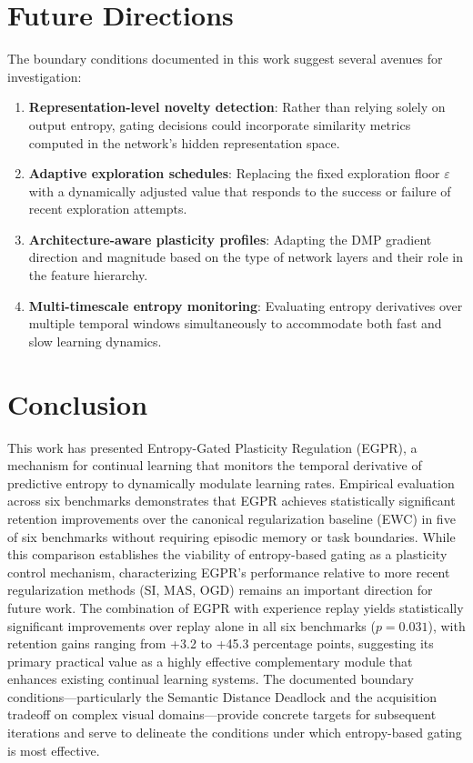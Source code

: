 \documentclass[11pt,a4paper]{article}
\begin{document}
\section{Future Directions}

The boundary conditions documented in this work suggest several avenues for investigation:

\begin{enumerate}
    \item \textbf{Representation-level novelty detection}: Rather than relying solely on output entropy, gating decisions could incorporate similarity metrics computed in the network's hidden representation space.
    \item \textbf{Adaptive exploration schedules}: Replacing the fixed exploration floor $\varepsilon$ with a dynamically adjusted value that responds to the success or failure of recent exploration attempts.
    \item \textbf{Architecture-aware plasticity profiles}: Adapting the DMP gradient direction and magnitude based on the type of network layers and their role in the feature hierarchy.
    \item \textbf{Multi-timescale entropy monitoring}: Evaluating entropy derivatives over multiple temporal windows simultaneously to accommodate both fast and slow learning dynamics.
\end{enumerate}

\section{Conclusion}

This work has presented Entropy-Gated Plasticity Regulation (EGPR), a mechanism for continual learning that monitors the temporal derivative of predictive entropy to dynamically modulate learning rates. Empirical evaluation across six benchmarks demonstrates that EGPR achieves statistically significant retention improvements over the canonical regularization baseline (EWC) in five of six benchmarks without requiring episodic memory or task boundaries. While this comparison establishes the viability of entropy-based gating as a plasticity control mechanism, characterizing EGPR's performance relative to more recent regularization methods (SI, MAS, OGD) remains an important direction for future work. The combination of EGPR with experience replay yields statistically significant improvements over replay alone in all six benchmarks ($p = 0.031$), with retention gains ranging from +3.2 to +45.3 percentage points, suggesting its primary practical value as a highly effective complementary module that enhances existing continual learning systems. The documented boundary conditions---particularly the Semantic Distance Deadlock and the acquisition tradeoff on complex visual domains---provide concrete targets for subsequent iterations and serve to delineate the conditions under which entropy-based gating is most effective.
\end{document}
